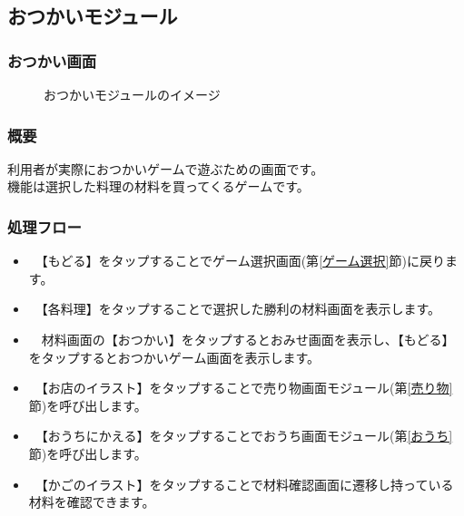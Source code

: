 \documentclass[a4j]{jarticle}
\begin{document}
\newpage
\subsection{おつかいモジュール}
\subsubsection{おつかい画面\label{おつかい}}
\begin{figure}[H]
    \begin{center}
    \caption {おつかいモジュールのイメージ}
    \label{functionselection}
    \end{center}
\end{figure}

\subsubsection*{概要}
利用者が実際におつかいゲームで遊ぶための画面です。\\
機能は選択した料理の材料を買ってくるゲームです。

\subsubsection*{処理フロー}
\begin{itemize}
\item　【もどる】をタップすることでゲーム選択画面(第\ref{ゲーム選択}節)に戻ります。
\item　【各料理】をタップすることで選択した勝利の材料画面を表示します。
\item　材料画面の【おつかい】をタップするとおみせ画面を表示し、【もどる】をタップするとおつかいゲーム画面を表示します。
\item　【お店のイラスト】をタップすることで売り物画面モジュール(第\ref{売り物}節)を呼び出します。
\item　【おうちにかえる】をタップすることでおうち画面モジュール(第\ref{おうち}節)を呼び出します。
\item　【かごのイラスト】をタップすることで材料確認画面に遷移し持っている材料を確認できます。
\end{itemize}
\end{document}
